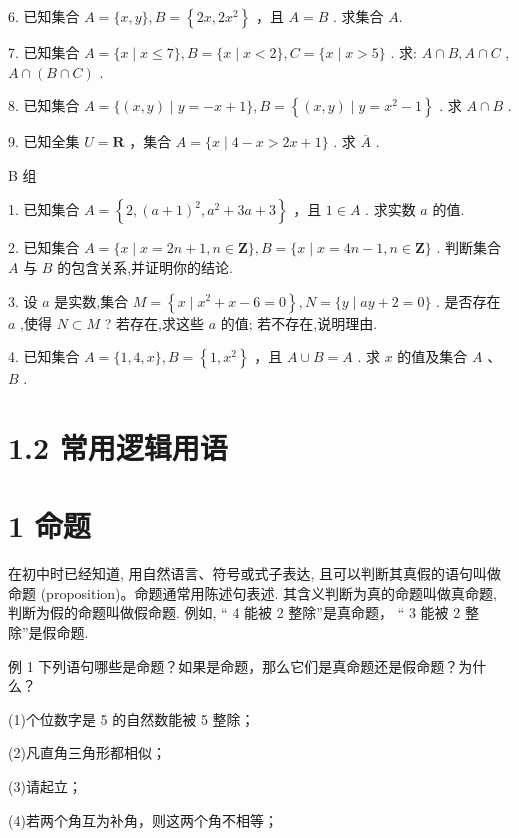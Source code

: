 \documentclass[10pt]{article}
\begin{document}
6. 已知集合 \(A = \{ x,y\} ,B = \left\{  {{2x},2{x}^{2}}\right\}\) ，且 \(A = B\) . 求集合 \(A.\)

7. 已知集合 \(A = \{ x \mid  x \leq  7\} ,B = \{ x \mid  x < 2\} ,C = \{ x \mid  x > 5\}\) . 求: \(A \cap  B,A \cap  C\) , \(A \cap  \left( {B \cap  C}\right)\) .

8. 已知集合 \(A = \{ \left( {x,y}\right)  \mid  y =  - x + 1\} ,B = \left\{  {\left( {x,y}\right)  \mid  y = {x}^{2} - 1}\right\}\) . 求 \(A \cap  B\) .

9. 已知全集 \(U = \mathbf{R}\) ，集合 \(A = \{ x \mid  4 - x > {2x} + 1\}\) . 求 \(\overline{A}\) .

B 组

1. 已知集合 \(A = \left\{  {2,{\left( a + 1\right) }^{2},{a}^{2} + {3a} + 3}\right\}\) ，且 \(1 \in  A\) . 求实数 \(a\) 的值.

2. 已知集合 \(A = \{ x \mid  x = {{2n} + 1},n \in  \mathbf{Z}\} ,B = \{ x \mid  x = {{4n} - 1},n \in  \mathbf{Z}\}\) . 判断集合 \(A\) 与 \(B\) 的包含关系,并证明你的结论.

3. 设 \(a\) 是实数,集合 \(M = \left\{  {x \mid  {x}^{2} + x - 6 = 0}\right\}  ,N = \{ y \mid  {ay} + 2 = 0\}\) . 是否存在 \(a\) ,使得 \(N \subset  M\) ? 若存在,求这些 \(a\) 的值; 若不存在,说明理由.

4. 已知集合 \(A = \{ 1,4,x\} ,B = \left\{  {1,{x}^{2}}\right\}\) ，且 \(A \cup  B = A\) . 求 \(x\) 的值及集合 \(A\) 、 \(B\) .

\section*{1.2 常用逻辑用语}

\section*{1 命题}

在初中时已经知道, 用自然语言、符号或式子表达, 且可以判断其真假的语句叫做命题 (proposition)。命题通常用陈述句表述. 其含义判断为真的命题叫做真命题, 判断为假的命题叫做假命题. 例如, “ 4 能被 2 整除”是真命题， “ 3 能被 2 整除”是假命题.

例 1 下列语句哪些是命题？如果是命题，那么它们是真命题还是假命题？为什么？

(1)个位数字是 5 的自然数能被 5 整除；

(2)凡直角三角形都相似；

(3)请起立；

(4)若两个角互为补角，则这两个角不相等；
\end{document}
